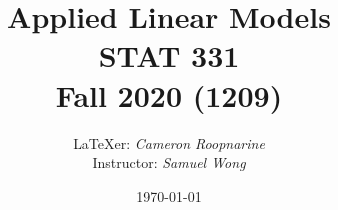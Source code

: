 



\title{
\LARGE Applied Linear Models\\
\large STAT 331\\
\normalsize Fall 2020 (1209)}
\author{\LaTeX{}er: \emph{Cameron Roopnarine}\\Instructor: \emph{Samuel Wong}}
\date{\today}



\maketitle

\tableofcontents

























